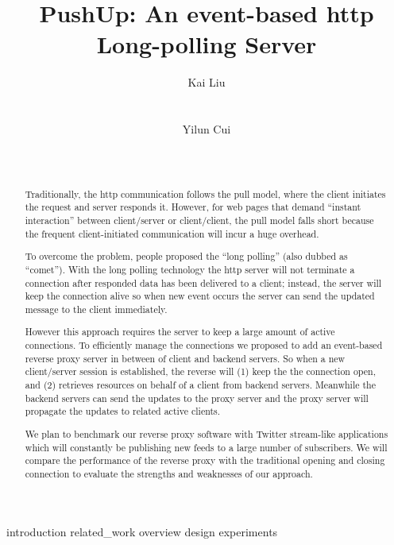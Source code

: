\documentclass{acm_proc_article-sp}
\begin{document}
\title{PushUp: An event-based http Long-polling Server}

\author{
\alignauthor
Kai Liu \\
       \\
       \\
\alignauthor
Yilun Cui \\
       \\
       \\
}

\maketitle
\begin{abstract}
Traditionally, the http communication follows the pull model, where the client initiates the request and server responds it. However, for web pages that demand ``instant interaction'' between client/server or client/client, the pull model falls short because the frequent client-initiated communication will incur a huge overhead.

To overcome the problem, people proposed the ``long polling'' (also dubbed as ``comet''). With the long polling technology the http server will not terminate a connection after responded data has been delivered to a client; instead, the server will keep the connection alive so when new event occurs the server can send the updated message to the client immediately.

However this approach requires the server to keep a large amount of active connections. To efficiently manage the connections we proposed to add an event-based reverse proxy server in between of client and backend servers. So when a new client/server session is established, the reverse will (1) keep the the connection open, and (2) retrieves resources on behalf of a client from backend servers. Meanwhile the backend servers can send the updates to the proxy server and the proxy server
will propagate the updates to related active clients.

We plan to benchmark our reverse proxy software with Twitter stream-like applications which will constantly be publishing new feeds to a large number of subscribers. We will compare the performance of the reverse proxy with the traditional opening and closing connection to evaluate the strengths and weaknesses of our approach. 
\end{abstract}

 {introduction}
 {related_work}
 {overview}
 {design}
 {experiments}

%

%
%
\end{document}
